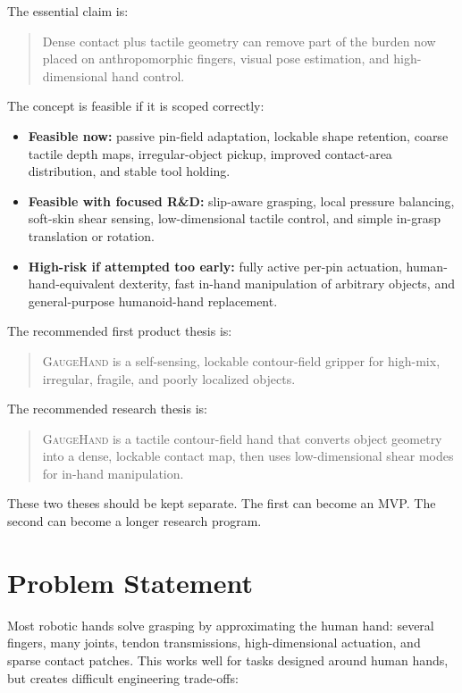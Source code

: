 \documentclass[11pt]{article}
\newcommand{\GaugeHand}{\textsc{GaugeHand}}
\begin{document}
The essential claim is:

\begin{quote}
Dense contact plus tactile geometry can remove part of the burden now placed on anthropomorphic fingers, visual pose estimation, and high-dimensional hand control.
\end{quote}

The concept is feasible if it is scoped correctly:

\begin{itemize}[leftmargin=*]
  \item \textbf{Feasible now:} passive pin-field adaptation, lockable shape retention, coarse tactile depth maps, irregular-object pickup, improved contact-area distribution, and stable tool holding.
  \item \textbf{Feasible with focused R\&D:} slip-aware grasping, local pressure balancing, soft-skin shear sensing, low-dimensional tactile control, and simple in-grasp translation or rotation.
  \item \textbf{High-risk if attempted too early:} fully active per-pin actuation, human-hand-equivalent dexterity, fast in-hand manipulation of arbitrary objects, and general-purpose humanoid-hand replacement.
\end{itemize}

The recommended first product thesis is:

\begin{quote}
\GaugeHand{} is a self-sensing, lockable contour-field gripper for high-mix, irregular, fragile, and poorly localized objects.
\end{quote}

The recommended research thesis is:

\begin{quote}
\GaugeHand{} is a tactile contour-field hand that converts object geometry into a dense, lockable contact map, then uses low-dimensional shear modes for in-hand manipulation.
\end{quote}

These two theses should be kept separate. The first can become an MVP. The second can become a longer research program.

\section{Problem Statement}

Most robotic hands solve grasping by approximating the human hand: several fingers, many joints, tendon transmissions, high-dimensional actuation, and sparse contact patches. This works well for tasks designed around human hands, but creates difficult engineering trade-offs:
\end{document}
